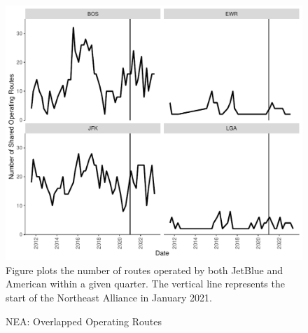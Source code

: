 \documentclass{article}
\begin{document}
\begin{appendices}
%			

    \begin{figure}[h]
        \caption{NEA: Overlapped Operating Routes}
        \label{fig:NEA_Operating}
        \includegraphics[width = \linewidth]{05.Figures/NEA_Operating_Graph.pdf}
        \footnotesize{Figure plots the number of routes operated by both JetBlue and American within a given quarter. The vertical line represents the start of the Northeast Alliance in January 2021.}
    \end{figure}


\end{appendices}
\end{document}

